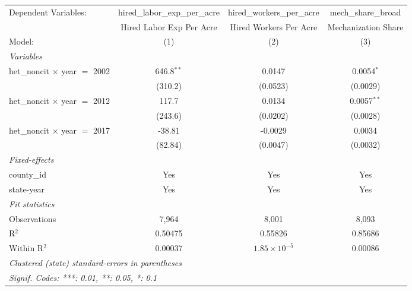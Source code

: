
\begingroup
\centering
\begin{tabular}{lccc}
   \tabularnewline \midrule \midrule
   Dependent Variables:                 & hired\_labor\_exp\_per\_acre     & hired\_workers\_per\_acre    & mech\_share\_broad\\    
                                        & Hired Labor Exp Per Acre         & Hired Workers Per Acre       & Mechanization Share \\   
   Model:                               & (1)                              & (2)                          & (3)\\  
   \midrule
   \emph{Variables}\\
   het\_noncit $\times$ year $=$ 2002   & 646.8$^{**}$                     & 0.0147                       & 0.0054$^{*}$\\   
                                        & (310.2)                          & (0.0523)                     & (0.0029)\\   
   het\_noncit $\times$ year $=$ 2012   & 117.7                            & 0.0134                       & 0.0057$^{**}$\\   
                                        & (243.6)                          & (0.0202)                     & (0.0028)\\   
   het\_noncit $\times$ year $=$ 2017   & -38.81                           & -0.0029                      & 0.0034\\   
                                        & (82.84)                          & (0.0047)                     & (0.0032)\\   
   \midrule
   \emph{Fixed-effects}\\
   county\_id                           & Yes                              & Yes                          & Yes\\  
   state-year                           & Yes                              & Yes                          & Yes\\  
   \midrule
   \emph{Fit statistics}\\
   Observations                         & 7,964                            & 8,001                        & 8,093\\  
   R$^2$                                & 0.50475                          & 0.55826                      & 0.85686\\  
   Within R$^2$                         & 0.00037                          & $1.85\times 10^{-5}$         & 0.00086\\  
   \midrule \midrule
   \multicolumn{4}{l}{\emph{Clustered (state) standard-errors in parentheses}}\\
   \multicolumn{4}{l}{\emph{Signif. Codes: ***: 0.01, **: 0.05, *: 0.1}}\\
\end{tabular}
\par\endgroup


